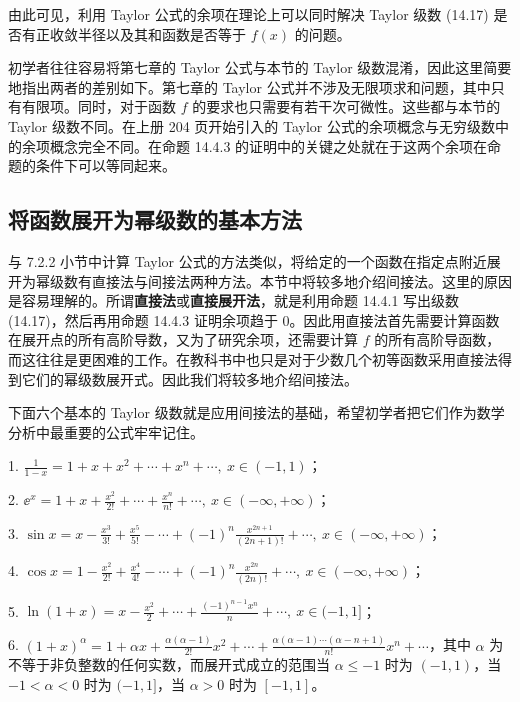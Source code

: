\begin{xremark}
由此可见，利用 Taylor 公式的余项在理论上可以同时解决 Taylor 级数 (14.17) 是否有正收敛半径以及其和函数是否等于 $f(x)$ 的问题。
\end{xremark}

\begin{xremark}
初学者往往容易将第七章的 Taylor 公式与本节的 Taylor 级数混淆，因此这里简要地指出两者的差别如下。第七章的 Taylor 公式并不涉及无限项求和问题，其中只有有限项。同时，对于函数 $f$ 的要求也只需要有若干次可微性。这些都与本节的 Taylor 级数不同。在上册 204 页开始引入的 Taylor 公式的余项概念与无穷级数中的余项概念完全不同。在命题 14.4.3 的证明中的关键之处就在于这两个余项在命题的条件下可以等同起来。
\end{xremark}

\subsection{将函数展开为幂级数的基本方法}

与 7.2.2 小节中计算 Taylor 公式的方法类似，将给定的一个函数在指定点附近展开为幂级数有直接法与间接法两种方法。本节中将较多地介绍间接法。这里的原因是容易理解的。所谓\textbf{直接法}或\textbf{直接展开法}，就是利用命题 14.4.1 写出级数 (14.17)，然后再用命题 14.4.3 证明余项趋于 $0$。因此用直接法首先需要计算函数在展开点的所有高阶导数，又为了研究余项，还需要计算 $f$ 的所有高阶导函数，而这往往是更困难的工作。在教科书中也只是对于少数几个初等函数采用直接法得到它们的幂级数展开式。因此我们将较多地介绍间接法。

下面六个基本的 Taylor 级数就是应用间接法的基础，希望初学者把它们作为数学分析中最重要的公式牢牢记住。

1. $\displaystyle\frac1{1-x}=1+x+x^2+\cdots+x^n+\cdots,\ x\in(-1,1)$；

2. $\displaystyle\ee^x=1+x+\frac{x^2}{2!}+\cdots+\frac{x^n}{n!}+\cdots,\ x\in(-\infty,+\infty)$；

3. $\displaystyle\sin x=x-\frac{x^3}{3!}+\frac{x^5}{5!}-\cdots+(-1)^n\frac{x^{2n+1}}{(2n+1)!}+\cdots,\ x\in(-\infty,+\infty)$；

4. $\displaystyle\cos x=1-\frac{x^2}{2!}+\frac{x^4}{4!}-\cdots+(-1)^n\frac{x^{2n}}{(2n)!}+\cdots,\ x\in(-\infty,+\infty)$；

5. $\displaystyle\ln(1+x)=x-\frac{x^2}{2}+\cdots+\frac{(-1)^{n-1}x^n}{n}+\cdots,\ x\in(-1,1]$；

6. $\displaystyle(1+x)^\alpha=1+\alpha x+\frac{\alpha(\alpha-1)}{2!}x^2+\cdots+\frac{\alpha(\alpha-1)\cdots(\alpha-n+1)}{n!}x^n+\cdots$，其中 $\alpha$ 为不等于非负整数的任何实数，而展开式成立的范围当 $\alpha\leqslant-1$ 时为 $(-1,1)$，当 $-1<\alpha<0$ 时为 $(-1,1]$，当 $\alpha>0$ 时为 $[-1,1]$。

